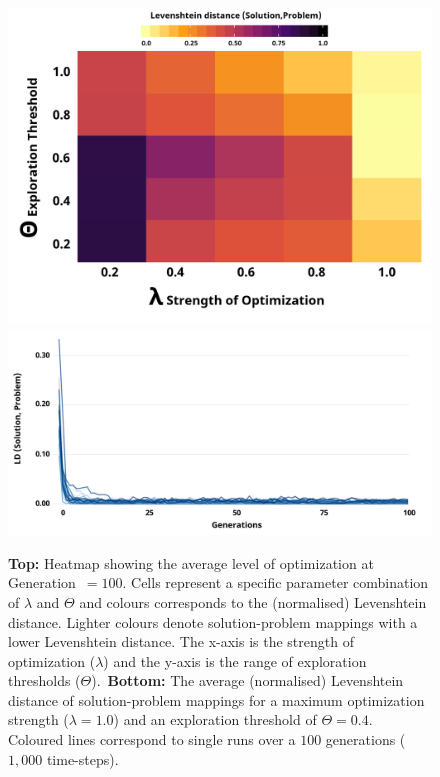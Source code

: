 \documentclass{article}
\begin{document}

\begin{figure}[H]
\begin{center}
    \includegraphics[width=\linewidth]{LD_heat.png}
    \includegraphics[width=\linewidth]{LD_runs.png}
\end{center}
    \caption{\textbf{Top:} Heatmap showing the average level of optimization at Generation~$=100$. Cells represent a specific parameter combination of $\lambda$ and $\Theta$ and colours corresponds to the (normalised) Levenshtein distance. Lighter colours denote solution-problem mappings with a lower Levenshtein distance. The x-axis is the strength of optimization ($\lambda$) and the y-axis is the range of exploration thresholds ($\Theta$).~\textbf{Bottom:} The average (normalised) Levenshtein distance of solution-problem mappings for a maximum optimization strength ($\lambda=1.0$) and an exploration threshold of $\Theta=0.4$. Coloured lines correspond to single runs over a $100$ generations ($1,000$ time-steps).}

\end{figure}
\end{document}
